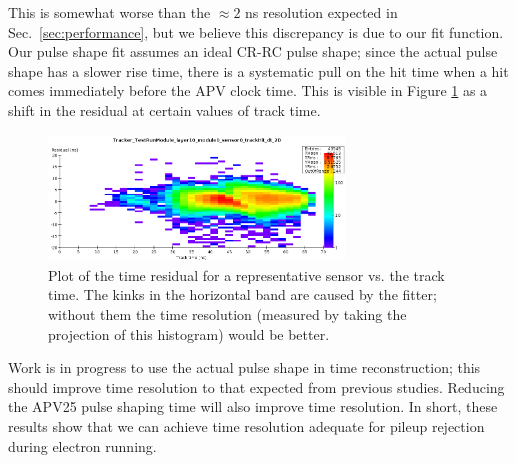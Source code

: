 This is somewhat worse than the $\approx 2$ ns resolution expected 
in 
Sec.~\ref{sec:performance}, but we believe this discrepancy is due to our fit function. Our pulse 
shape fit assumes an ideal CR-RC pulse shape; since the actual pulse shape has a slower rise time, 
there is a systematic pull on the hit time when a hit comes immediately before the APV clock time. 
This is visible in Figure \ref{fig:timeres_2D} as a shift in the residual at certain values of track time.
\begin{figure}[h]
	\includegraphics[width=0.7\textwidth]{test2012/svtperformance/timeres_2D}
	\caption{\small{Plot of the time residual for a representative sensor vs. the track time. 
		The kinks in the horizontal band are caused by the fitter; without them the time resolution (measured by taking the projection of this histogram) would be better.} }
	\label{fig:timeres_2D}
\end{figure}
Work is in progress to use the actual pulse shape in time reconstruction; this should improve time resolution to that expected from previous studies. 
Reducing the APV25 pulse shaping time will also improve time resolution.
In short, these results show that we can achieve time resolution adequate for pileup rejection during electron running.





